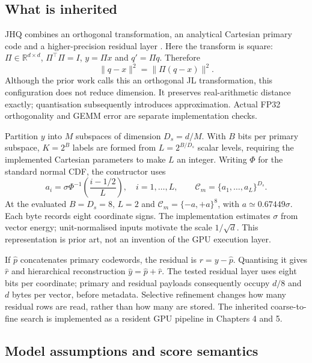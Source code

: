 \subsection{What is inherited}

JHQ combines an orthogonal transformation, an analytical Cartesian primary
code and a higher-precision residual layer \cite{jhq}. Here the transform
is square: $\Pi\in\mathbb R^{d\times d}$, $\Pi^\top\Pi=I$,
$y=\Pi x$ and $q'=\Pi q$. Therefore
\begin{equation}
 \|q-x\|^2=\|\Pi(q-x)\|^2.
 \label{eq:2-isometry}
\end{equation}
Although the prior work calls this an orthogonal JL transformation, this
configuration does not reduce dimension. It preserves real-arithmetic
distance exactly; quantisation subsequently introduces approximation.
Actual FP32 orthogonality and GEMM error are separate implementation checks.

Partition $y$ into $M$ subspaces of dimension $D_s=d/M$. With $B$ bits per
primary subspace, $K=2^B$ labels are formed from $L=2^{B/D_s}$ scalar levels,
requiring the implemented Cartesian parameters to make $L$ an integer.
Writing $\Phi$ for the standard normal CDF, the constructor uses
\begin{equation}
 a_i=\sigma\Phi^{-1}\!\left(\frac{i-1/2}{L}\right),\quad
 i=1,\ldots,L,\qquad
 \mathcal C_m=\{a_1,\ldots,a_L\}^{D_s}.
 \label{eq:2-cartesian}
\end{equation}
At the evaluated $B=D_s=8$, $L=2$ and $\mathcal C_m=\{-a,+a\}^8$,
with $a\simeq0.67449\sigma$. Each byte records eight coordinate signs.
The implementation estimates $\sigma$ from vector energy; unit-normalised
inputs motivate the scale $1/\sqrt d$. This representation is prior art,
not an invention of the GPU execution layer.

If $\widehat p$ concatenates primary codewords, the residual is
$r=y-\widehat p$. Quantising it gives $\widehat r$ and hierarchical
reconstruction $\widehat y=\widehat p+\widehat r$. The tested residual layer
uses eight bits per coordinate; primary and residual payloads consequently
occupy $d/8$ and $d$ bytes per vector, before metadata. Selective refinement
changes how many residual rows are read, rather than how many are stored.
The inherited coarse-to-fine search is implemented as a resident GPU pipeline
in Chapters 4 and 5.

\subsection{Model assumptions and score semantics}

